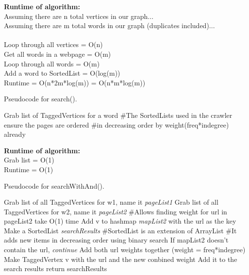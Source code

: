 \documentclass[12pt]{article}
\begin{document}
\noindent \textbf{Runtime of algorithm:} \\
Assuming there are n total vertices in our graph...\\
Assuming there are m total words in our graph (duplicates included)...\\\\
Loop through all vertices = O(n)\\
Get all words in a webpage = O(m)\\
Loop through all words = O(m)\\
Add a word to SortedList = O(log(m))\\

\noindent Runtime = O(n*2m*log(m)) = O(n*m*log(m))




\pagebreak



\begin{algorithm}[H]
\caption{Pseudocode for search().}
\begin{algorithmic}
\State 
\State 
\State Grab list of TaggedVertices for a word
\State 
\State \#The SortedLists used in the crawler ensure the pages are ordered
\State \#in decreasing order by weight(freq*indegree) already
\State 
\end{algorithmic}
\end{algorithm}

\noindent \textbf{Runtime of algorithm:} \\
Grab list = O(1)\\
Runtime = O(1)\\

\pagebreak

\begin{algorithm}[H]
\caption{Pseudocode for searchWithAnd().}
\begin{algorithmic}
\State Grab list of all TaggedVertices for w1, name it \textit{pageList1}
\State Grab list of all TaggedVertices for w2, name it \textit{pageList2}
\State 
\State \#Allows finding weight for url in pageList2 take O(1) time
\State Add v to hashmap \textit{mapList2} with the url as the key
\EndFor
\State Make a SortedList \textit{searchResults}
\State \#SortedList is an extension of ArrayList
\State \#It adds new items in decreasing order using binary search
\State 
{}
\State If mapList2 doesn't contain the url, \textit{continue}
\State 
\State Add both url weights together (weight = freq*indegree)
\State 
\State Make TaggedVertex v with the url and the new conbined weight
\State Add it to the search results
\EndFor
\State return searchResults
\end{algorithmic}
\end{algorithm}
\end{document}
